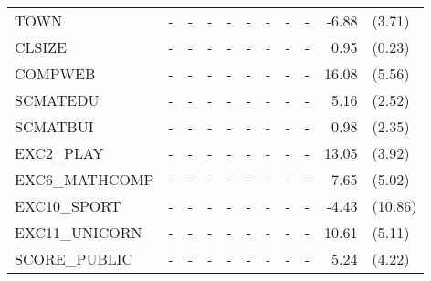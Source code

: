 \documentclass[10pt]{article}
\begin{document}
\begin{table}[htbp]
\begin{tabular}{lrlrlrlrlrl}
     	TOWN  & \multicolumn{1}{c}{-} & \multicolumn{1}{c}{-} & \multicolumn{1}{c}{-} & \multicolumn{1}{c}{-} & \multicolumn{1}{c}{-} & \multicolumn{1}{c}{-} & \multicolumn{1}{c}{-} & \multicolumn{1}{c}{-} & -6.88 & (3.71) \\[0.2em]
     	CLSIZE & \multicolumn{1}{c}{-} & \multicolumn{1}{c}{-} & \multicolumn{1}{c}{-} & \multicolumn{1}{c}{-} & \multicolumn{1}{c}{-} & \multicolumn{1}{c}{-} & \multicolumn{1}{c}{-} & \multicolumn{1}{c}{-} & 0.95  & (0.23) \\[0.2em]
     	COMPWEB & \multicolumn{1}{c}{-} & \multicolumn{1}{c}{-} & \multicolumn{1}{c}{-} & \multicolumn{1}{c}{-} & \multicolumn{1}{c}{-} & \multicolumn{1}{c}{-} & \multicolumn{1}{c}{-} & \multicolumn{1}{c}{-} & 16.08 & (5.56) \\[0.2em]
     	SCMATEDU & \multicolumn{1}{c}{-} & \multicolumn{1}{c}{-} & \multicolumn{1}{c}{-} & \multicolumn{1}{c}{-} & \multicolumn{1}{c}{-} & \multicolumn{1}{c}{-} & \multicolumn{1}{c}{-} & \multicolumn{1}{c}{-} & 5.16  & (2.52) \\[0.2em]
     	SCMATBUI & \multicolumn{1}{c}{-} & \multicolumn{1}{c}{-} & \multicolumn{1}{c}{-} & \multicolumn{1}{c}{-} & \multicolumn{1}{c}{-} & \multicolumn{1}{c}{-} & \multicolumn{1}{c}{-} & \multicolumn{1}{c}{-} & 0.98  & (2.35) \\[0.2em]
     	EXC2\_PLAY & \multicolumn{1}{c}{-} & \multicolumn{1}{c}{-} & \multicolumn{1}{c}{-} & \multicolumn{1}{c}{-} & \multicolumn{1}{c}{-} & \multicolumn{1}{c}{-} & \multicolumn{1}{c}{-} & \multicolumn{1}{c}{-} & 13.05 & (3.92) \\[0.2em]
     	EXC6\_MATHCOMP & \multicolumn{1}{c}{-} & \multicolumn{1}{c}{-} & \multicolumn{1}{c}{-} & \multicolumn{1}{c}{-} & \multicolumn{1}{c}{-} & \multicolumn{1}{c}{-} & \multicolumn{1}{c}{-} & \multicolumn{1}{c}{-} & 7.65  & (5.02) \\[0.2em]
     	EXC10\_SPORT & \multicolumn{1}{c}{-} & \multicolumn{1}{c}{-} & \multicolumn{1}{c}{-} & \multicolumn{1}{c}{-} & \multicolumn{1}{c}{-} & \multicolumn{1}{c}{-} & \multicolumn{1}{c}{-} & \multicolumn{1}{c}{-} & -4.43 & (10.86) \\[0.2em]
     	EXC11\_UNICORN & \multicolumn{1}{c}{-} & \multicolumn{1}{c}{-} & \multicolumn{1}{c}{-} & \multicolumn{1}{c}{-} & \multicolumn{1}{c}{-} & \multicolumn{1}{c}{-} & \multicolumn{1}{c}{-} & \multicolumn{1}{c}{-} & 10.61 & (5.11) \\[0.2em]
     	SCORE\_PUBLIC & \multicolumn{1}{c}{-} & \multicolumn{1}{c}{-} & \multicolumn{1}{c}{-} & \multicolumn{1}{c}{-} & \multicolumn{1}{c}{-} & \multicolumn{1}{c}{-} & \multicolumn{1}{c}{-} & \multicolumn{1}{c}{-} & 5.24  & (4.22) \\[0.2em]

\end{tabular}
\end{table}
\end{document}
